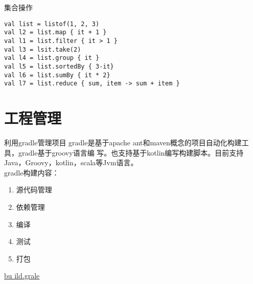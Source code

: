 \documentclass[UTF8]{ctexbeamer}
\begin{document}
\begin{frame}[fragile]{集合操作}
\begin{lstlisting}
val list = listof(1, 2, 3)
val l2 = list.map { it + 1 }
val l1 = list.filter { it > 1 }
val l3 = lsit.take(2)
val l4 = list.group { it }
val l5 = list.sortedBy { 3-it}
val l6 = list.sumBy { it * 2}
val l7 = list.reduce { sum, item -> sum + item }
\end{lstlisting}
\end{frame}

  
  



\section{工程管理}
\frame{\tableofcontents[currentsection]}
\begin{frame}[fragile]{利用gradle管理项目}
  gradle是基于apache ant和maven概念的项目自动化构建工具，gradle基于groovy语言编
  写。也支持基于kotlin编写构建脚本。目前支持Java，Groovy，kotlin，scala等Jvm语言。\\
  \vspace{1em}
  gradle构建内容：
  \begin{enumerate}
  \item 源代码管理
  \item 依赖管理
  \item 编译
  \item 测试
  \item 打包
  \end{enumerate}
  \href{./resource/build.gradle}{bu
    ild.grale}
\end{frame}


\end{document}
